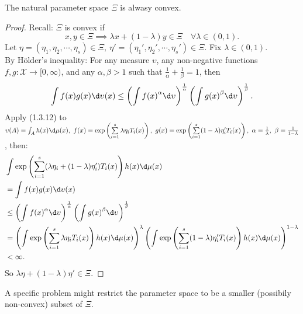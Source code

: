 \documentclass[a4paper]{article}
\begin{document}
\begin{prop}
	The natural parameter space $\Xi$ is alwasy convex.
\end{prop}

\begin{proof}
	Recall: $\Xi$ is convex if
	\begin{equation*}
		x, y \in \Xi \implies \lambda x + (1-\lambda)y \in \Xi \quad \forall \lambda \in (0,1).
	\end{equation*}
	Let $\eta = (\eta_1,\eta_2,\cdots,\eta_s) \in \Xi, \ \eta' = (\eta_1',\eta_2',\cdots,\eta_s') \in \Xi$. Fix $\lambda \in (0,1)$. \\
	\newline
	By Hölder's inequality: For any measure $\upsilon$, any non-negative functions $f,g: \mathcal{X} \to [0,\infty)$, and any $\alpha,\beta > 1$ such that $\frac{1}{\alpha}+\frac{1}{\beta} = 1$, then
	\begin{equation}
		\int f(x)g(x) \d \upsilon (x) \leq \left(\int {f(x)}^{\alpha} \d \upsilon\right)^{\frac{1}{\alpha}}\left(\int {g(x)}^{\beta} \d \upsilon\right)^{\frac{1}{\beta}}.
	\end{equation}
	\noindent Apply (1.3.12) to $\upsilon(A) = \int_A h(x) \d \mu (x), \ f(x) = \exp\left(\sum\limits_{i = 1}^s \lambda \eta_i T_i(x)\right), \ g(x) = \exp\left(\sum\limits_{i = 1}^s (1 - \lambda)\eta_i' T_i (x)\right), \ \alpha = \frac{1}{\lambda}, \ \beta = \frac{1}{1-\lambda}$, then:
	\begin{equation}
		\begin{aligned}
			&\int \exp \left(\sum\limits_{i = 1}^s(\lambda \eta_i + (1-\lambda) \eta_i')T_i (x)\right)h(x) \d \mu (x) \\
			&= \int f(x)g(x) \d \upsilon (x) \\
			&\leq \left(\int {f(x)}^{\alpha} \d \upsilon\right)^{\frac{1}{\alpha}}\left(\int {g(x)}^{\beta} \d \upsilon\right)^{\frac{1}{\beta}} \\
			&= \left(\int \exp\left(\sum\limits_{i = 1}^s \lambda \eta_i T_i(x)\right) h(x) \d \mu (x)\right)^{\lambda} \left(\int \exp\left(\sum\limits_{i = 1}^s (1 - \lambda)\eta_i' T_i (x)\right) h(x) \d \mu (x)\right)^{1 - \lambda} \\
			&< \infty.
		\end{aligned}
	\end{equation}
	So $\lambda \eta + (1-\lambda)\eta' \in \Xi$.
\end{proof}

\begin{remark}
	A specific problem might restrict the parameter space to be a smaller (possibily non-convex) subset of $\Xi$.
\end{remark}
\end{document}
